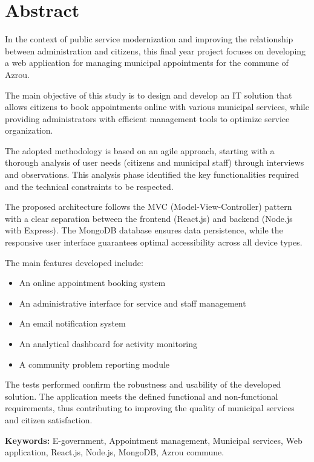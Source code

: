 \chapter*{Abstract}

In the context of public service modernization and improving the relationship between administration and citizens, this final year project focuses on developing a web application for managing municipal appointments for the commune of Azrou.

The main objective of this study is to design and develop an IT solution that allows citizens to book appointments online with various municipal services, while providing administrators with efficient management tools to optimize service organization.

The adopted methodology is based on an agile approach, starting with a thorough analysis of user needs (citizens and municipal staff) through interviews and observations. This analysis phase identified the key functionalities required and the technical constraints to be respected.

The proposed architecture follows the MVC (Model-View-Controller) pattern with a clear separation between the frontend (React.js) and backend (Node.js with Express). The MongoDB database ensures data persistence, while the responsive user interface guarantees optimal accessibility across all device types.

The main features developed include:
\begin{itemize}
    \item An online appointment booking system
    \item An administrative interface for service and staff management
    \item An email notification system
    \item An analytical dashboard for activity monitoring
    \item A community problem reporting module
\end{itemize}

The tests performed confirm the robustness and usability of the developed solution. The application meets the defined functional and non-functional requirements, thus contributing to improving the quality of municipal services and citizen satisfaction.

\textbf{Keywords:} E-government, Appointment management, Municipal services, Web application, React.js, Node.js, MongoDB, Azrou commune.
